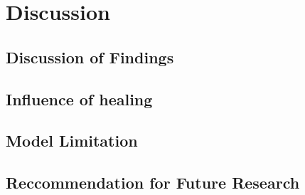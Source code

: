 \pagebreak
\section{Discussion}

\subsection{Discussion of Findings}
\subsection{Influence of healing}
\subsection{Model Limitation}
\subsection{Reccommendation for Future Research}
